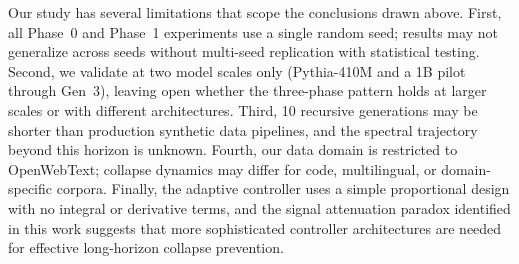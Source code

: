 
Our study has several limitations that scope the conclusions drawn above.
First, all Phase~0 and Phase~1 experiments use a single random seed; results may not generalize across seeds without multi-seed replication with statistical testing.
Second, we validate at two model scales only (Pythia-410M and a 1B pilot through Gen~3), leaving open whether the three-phase pattern holds at larger scales or with different architectures.
Third, 10 recursive generations may be shorter than production synthetic data pipelines, and the spectral trajectory beyond this horizon is unknown.
Fourth, our data domain is restricted to OpenWebText; collapse dynamics may differ for code, multilingual, or domain-specific corpora.
Finally, the adaptive controller uses a simple proportional design with no integral or derivative terms, and the signal attenuation paradox identified in this work suggests that more sophisticated controller architectures are needed for effective long-horizon collapse prevention.